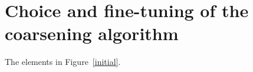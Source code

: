 \documentclass[runningheads]{llncs}
\begin{document}
\appendix

\section{Choice and fine-tuning of the coarsening algorithm}\label{ap}
The elements in Figure~\ref{initial}.



\end{document}
